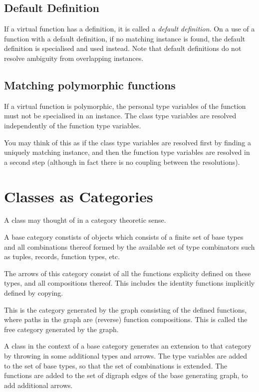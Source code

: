 \documentclass[oneside]{book}
\begin{document}
\subsection{Default Definition}
If a virtual function has a definition, it is called
a {\em default definition}. On a use of a function with
a default definition, if no matching instance is found, 
the default definition is specialised and used instead.
Note that default definitions do not resolve ambiguity
from overlapping instances.

\subsection{Matching polymorphic functions}
If a virtual function is polymorphic, the personal
type variables of the function must not be specialised
in an instance. The class type variables are resolved
independently of the function type variables.

You may think of this as if the class type variables
are resolved first by finding a uniquely matching
instance, and then the function type variables are
resolved in a second step (although in fact there
is no coupling between the resolutions).

\section{Classes as Categories}
A class may thought of in a category theoretic sense.

A base category constists of objects which consists of a 
finite set of base types and all combinations thereof formed
by the available set of type combinators such as tuples,
records, function types, etc. 

The arrows of this category
consist of all the functions explicity defined on these
types, and all compositions thereof. This includes the
identity functions implicitly defined by copying.

This is the category generated by the graph consisting
of the defined functions, where paths in the graph
are (reverse) function compositions. This is called
the free category generated by the graph.

A class in the context of a base category generates
an extension to that category by throwing in some
additional types and arrows. The type variables are added 
to the set of base types, so that the set of combinations
is extended. The functions are added to the set of digraph
edges of the base generating graph, to add additional
arrows.
\end{document}
